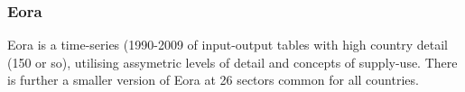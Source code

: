 \subsubsection{Eora}


Eora is a time-series (1990-2009 of input-output tables with high country detail (150 or so), utilising assymetric levels of detail and concepts of supply-use. There is further a smaller version of Eora at 26 sectors common for all countries.